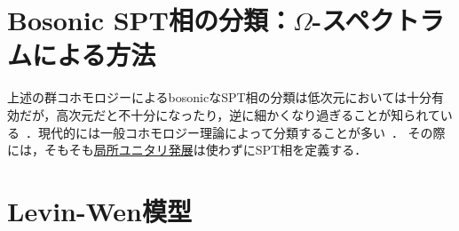 \documentclass[TQFT_main]{subfiles}
\begin{document}
\section{Bosonic SPT相の分類：$\Omega$-スペクトラムによる方法}

上述の群コホモロジーによるbosonicなSPT相の分類は低次元においては十分有効だが，高次元だと不十分になったり，逆に細かくなり過ぎることが知られている~\cite{Kapustin2014SPT}．現代的には一般コホモロジー理論によって分類することが多い~\cite{Xiong2019SPT}．
その際には，そもそも\hyperref[prop:LU]{局所ユニタリ発展}は使わずにSPT相を定義する．

\section{Levin-Wen模型}
\end{document}
